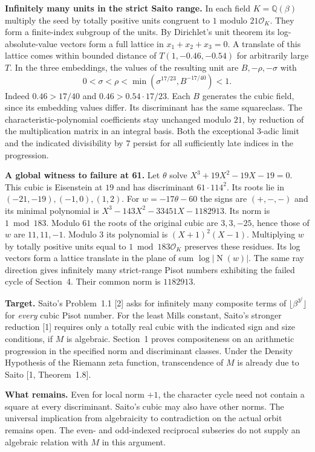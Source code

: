 \documentclass[11pt,a4paper,oneside,openany]{book}
\newcommand{\Q}{\mathbb Q}\newcommand{\C}{\mathbb C}\newcommand{\Z}{\mathbb Z}\newcommand{\F}{\mathbb F}\newcommand{\Tr}{\operatorname{Tr}}\newcommand{\Nm}{\operatorname{N}}\newcommand{\ord}{\operatorname{ord}}\newcommand{\K}{K}\newcommand{\OO}{\mathcal O_K}\newcommand{\unit}{\mathcal U}
\newcommand{\lead}[1]{\textbf{#1}\enspace}\let\para\lead
\begin{document}
\lead{Infinitely many units in the strict Saito range.} In each field $K=\Q(\beta)$ multiply the seed by totally positive units congruent to $1$ modulo $21\mathcal O_K$. They form a finite-index subgroup of the units. By Dirichlet's unit theorem its log-absolute-value vectors form a full lattice in $x_1+x_2+x_3=0$. A translate of this lattice comes within bounded distance of $T(1,-0.46,-0.54)$ for arbitrarily large $T$. In the three embeddings, the values of the resulting unit are $B,-\rho,-\sigma$ with
\[
 0<\sigma<\rho<\min(\sigma^{17/23},B^{-17/40})<1.
\]
Indeed $0.46>17/40$ and $0.46>0.54\cdot17/23$. Each $B$ generates the cubic field, since its embedding values differ. Its discriminant has the same squareclass. The characteristic-polynomial coefficients stay unchanged modulo $21$, by reduction of the multiplication matrix in an integral basis. Both the exceptional $3$-adic limit and the indicated divisibility by $7$ persist for all sufficiently late indices in the progression.

\lead{A global witness to failure at 61.} Let $\theta$ solve $X^3+19X^2-19X-19=0$. This cubic is Eisenstein at $19$ and has discriminant $61\cdot114^2$. Its roots lie in $(-21,-19),(-1,0),(1,2)$. For $w=-17\theta-60$ the signs are $(+,-,-)$ and its minimal polynomial is $X^3-143X^2-33451X-1182913$. Its norm is $1\bmod183$. Modulo $61$ the roots of the original cubic are $3,3,-25$, hence those of $w$ are $11,11,-1$. Modulo $3$ its polynomial is $(X+1)^2(X-1)$. Multiplying $w$ by totally positive units equal to $1\bmod183\mathcal O_K$ preserves these residues. Its log vectors form a lattice translate in the plane of sum $\log|\Nm(w)|$. The same ray direction gives infinitely many strict-range Pisot numbers exhibiting the failed cycle of Section~4. Their common norm is $1182913$.



\lead{Target.} Saito's Problem~1.1 [2] asks for infinitely many composite terms of $\lfloor\beta^{3^j}\rfloor$ for \emph{every} cubic Pisot number. For the least Mills constant, Saito's stronger reduction [1] requires only a totally real cubic with the indicated sign and size conditions, if $M$ is algebraic. Section~1 proves compositeness on an arithmetic progression in the specified norm and discriminant classes. Under the Density Hypothesis of the Riemann zeta function, transcendence of $M$ is already due to Saito [1, Theorem~1.8].

\lead{What remains.} Even for local norm $+1$, the character cycle need not contain a square at every discriminant. Saito's cubic may also have other norms. The universal implication from algebraicity to contradiction on the actual orbit remains open. The even- and odd-indexed reciprocal subseries do not supply an algebraic relation with $M$ in this argument.
\end{document}
